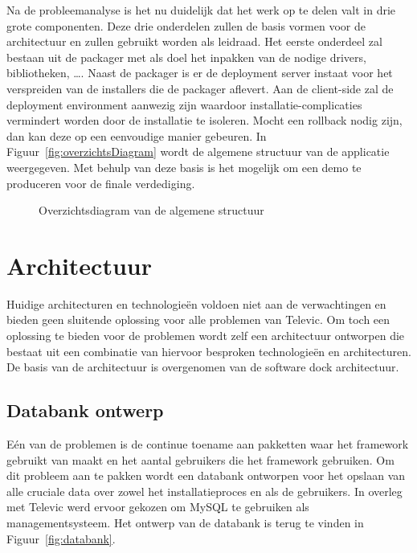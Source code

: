 Na de probleemanalyse is het nu duidelijk dat het werk op te delen valt in drie grote componenten.
Deze drie onderdelen zullen de basis vormen voor de architectuur en zullen gebruikt worden als leidraad.
Het eerste onderdeel zal bestaan uit de packager met als doel het inpakken van de nodige drivers, bibliotheken, \ldots .
Naast de packager is er de deployment server instaat voor het verspreiden van de installers die de packager aflevert.
Aan de client-side zal de deployment environment aanwezig zijn waardoor installatie-complicaties vermindert worden door de installatie te isoleren.
Mocht een rollback nodig zijn, dan kan deze op een eenvoudige manier gebeuren.
In Figuur~\vref{fig:overzichtsDiagram} wordt de algemene structuur van de applicatie weergegeven.
Met behulp van deze basis is het mogelijk om een demo te produceren voor de finale verdediging.

\begin{figure}[!hbt]
\centering
  
  \caption{Overzichtsdiagram van de algemene structuur}
  \label{fig:overzichtsDiagram}
\end{figure}

\section{Architectuur}
Huidige architecturen en technologieën voldoen niet aan de verwachtingen en bieden geen sluitende oplossing voor alle problemen van Televic.
Om toch een oplossing te bieden voor de problemen wordt zelf een architectuur ontworpen die bestaat uit een combinatie van hiervoor besproken technologieën en architecturen.
De basis van de architectuur is overgenomen van de software dock architectuur.


\subsection{Databank ontwerp}\label{sec:databank}
Eén van de problemen is de continue toename aan pakketten waar het framework gebruikt van maakt en het aantal gebruikers die het framework gebruiken.
Om dit probleem aan te pakken wordt een databank ontworpen voor het opslaan van alle cruciale data over zowel het installatieproces en als de gebruikers.
In overleg met Televic werd ervoor gekozen om MySQL te gebruiken als managementsysteem.
Het ontwerp van de databank is terug te vinden in Figuur~\ref{fig:databank}.


